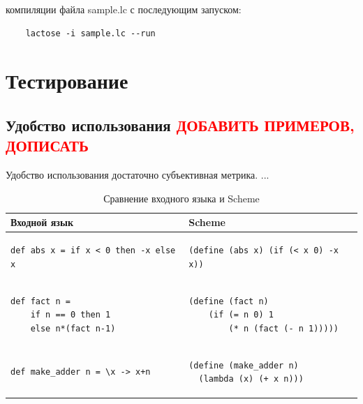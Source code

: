 \documentclass[12pt,a4paper,oneside]{extarticle}
\begin{document}
         компиляции файла sample.lc с последующим запуском:
        \begin{lstlisting}        
    lactose -i sample.lc --run
        \end{lstlisting}
\clearpage

\section{Тестирование}
    \subsection{Удобство использования \textcolor{red}{ДОБАВИТЬ ПРИМЕРОВ, ДОПИСАТЬ}}
        Удобство использования достаточно субъективная метрика. ...

        \begin{table}[h!]
            \label{tabular:syntax}
            \centering        
            \begin{tabular}{|l|l|}
                \hline
                \textbf{Входной язык} & \textbf{Scheme}
                \\ \hline
                    \begin{lstlisting}
def abs x = if x < 0 then -x else x
                    \end{lstlisting} &
                    \begin{lstlisting}
(define (abs x) (if (< x 0) -x x))
                    \end{lstlisting}
                \\ \hline
                    \begin{lstlisting}
def fact n = 
    if n == 0 then 1
    else n*(fact n-1)
                    \end{lstlisting} &
                    \begin{lstlisting}
(define (fact n)
    (if (= n 0) 1
        (* n (fact (- n 1)))))
                    \end{lstlisting}
                \\ \hline
                    \begin{lstlisting}
def make_adder n = \x -> x+n
                    \end{lstlisting} &
                    \begin{lstlisting}
(define (make_adder n) 
  (lambda (x) (+ x n)))
                    \end{lstlisting}
                \\ \hline
            \end{tabular}
        \caption{Сравнение входного языка и Scheme}
        \end{table}
\end{document}
